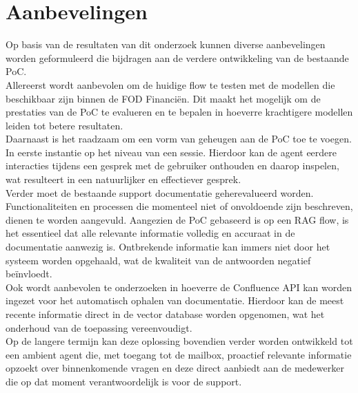 
\chapter{Aanbevelingen}
\label{ch:aanbevelingen}

Op basis van de resultaten van dit onderzoek kunnen diverse aanbevelingen worden geformuleerd die bijdragen aan de verdere ontwikkeling van de bestaande PoC. 
\\[1em]
Allereerst wordt aanbevolen om de huidige flow te testen met de modellen die beschikbaar zijn binnen de FOD Financiën. Dit maakt het mogelijk om de prestaties van de PoC te evalueren en te bepalen in hoeverre krachtigere modellen leiden tot betere resultaten.
\\[1em]
Daarnaast is het raadzaam om een vorm van geheugen aan de PoC toe te voegen. In eerste instantie op het niveau van een sessie. Hierdoor kan de agent eerdere interacties tijdens een gesprek met de gebruiker onthouden en daarop inspelen, wat resulteert in een natuurlijker en effectiever gesprek.
\\[1em]
Verder moet de bestaande support documentatie geherevalueerd worden. Functionaliteiten en processen die momenteel niet of onvoldoende zijn beschreven, dienen te worden aangevuld. Aangezien de PoC gebaseerd is op een RAG flow, is het essentieel dat alle relevante informatie volledig en accuraat in de documentatie aanwezig is. Ontbrekende informatie kan immers niet door het systeem worden opgehaald, wat de kwaliteit van de antwoorden negatief beïnvloedt.
\\[1em]
Ook wordt aanbevolen te onderzoeken in hoeverre de Confluence API kan worden ingezet voor het automatisch ophalen van documentatie. Hierdoor kan de meest recente informatie direct in de vector database worden opgenomen, wat het onderhoud van de toepassing vereenvoudigt.
\\[1em]
Op de langere termijn kan deze oplossing bovendien verder worden ontwikkeld tot een ambient agent die, met toegang tot de mailbox, proactief relevante informatie opzoekt over binnenkomende vragen en deze direct aanbiedt aan de medewerker die op dat moment verantwoordelijk is voor de support.